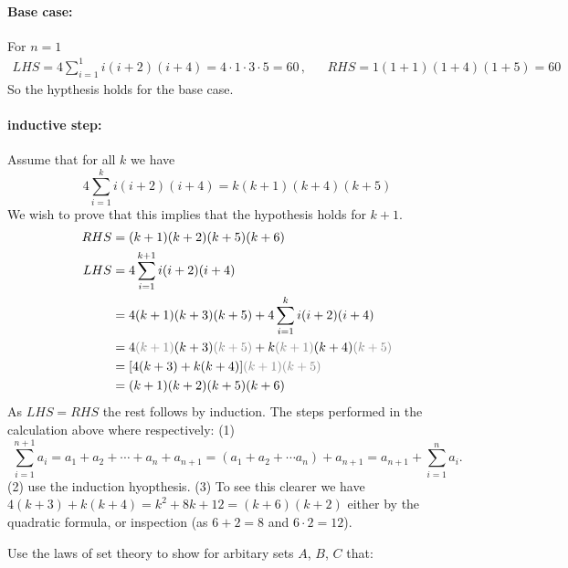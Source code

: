 \documentclass[a4paper, english, 12pt]{article} %
\begin{document}
\begin{answer}
  \paragraph{Base case:} For $n=1$
  \begin{align*}
    LHS = 4 \sum_{i=1}^{1} i(i+2)(i+4) = 4\cdot 1 \cdot 3 \cdot 5 = 60\,,
    && RHS = 1(1+1)(1+4)(1+5) = 60
  \end{align*}
  So the hypthesis holds for the base case.
  \paragraph{inductive step:} Assume that for all $k$ we have
  \begin{equation*}
    4 \sum_{i=1}^k i(i+2)(i+4) = k(k+1)(k+4)(k+5)
  \end{equation*}
  We wish to prove that this implies that the hypothesis holds for $k+1$.
  \begin{align*}
    RHS & = (k+1)(k+2)(k+5)(k+6) \\
    LHS & = 4 \sum_{i = 1}^{k+1} i(i+2)(i+4) \\
        & = 4 (k+1)(k+3)(k+5) + 4 \sum_{i=1}^{k} i(i+2)(i+4) \\
        & = 4 \textcolor{gray}{(k+1)}(k+3)\textcolor{gray}{(k+5)} + k\textcolor{gray}{(k+1)}(k+4)\textcolor{gray}{(k+5)} \\
        & = [4(k+3) + k(k+4)]\textcolor{gray}{(k+1)(k+5)} \\
        & = (k+1)(k+2)(k+5)(k+6)
  \end{align*}
  As $LHS = RHS$ the rest follows by induction. The steps performed in the
  calculation above where respectively: (1)
  \begin{equation*}
    \sum_{i=1}^{n+1} a_i = a_1 + a_2 + \cdots + a_{n} + a_{n+1}
    = ( a_1 + a_2 + \cdots a_{n} ) + a_{n+1}
    = a_{n+1} + \sum_{i = 1}^{n} a_i.
  \end{equation*}
  (2) use the induction hyopthesis. (3) To see this clearer we
  have $4(k+3) + k(k+4) = k^2 + 8k + 12 = (k+6)(k+2)$ either by the quadratic
  formula, or inspection (as $6+2 = 8$ and $6\cdot 2 = 12$).
\end{answer}
  

\begin{problem}[7]
  Use the laws of set theory to show for arbitary sets $A$, $B$, $C$ that:
\end{problem}
\end{document}
